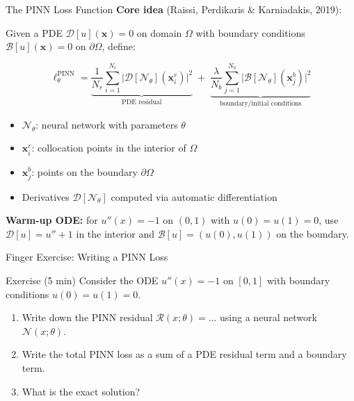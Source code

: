 \documentclass[aspectratio=169,11pt]{beamer}
\newcommand{\emphc}[1]{\textcolor{harvardcrimson}{#1}}
\newcommand{\x}{\bm{x}}
\begin{document}
\begin{frame}{The PINN Loss Function}
\textbf{Core idea} (Raissi, Perdikaris \& Karniadakis, 2019):

\vspace{0.15em}
Given a PDE $\mathcal{D}[u](\x) = 0$ on domain $\Omega$ with boundary conditions
$\mathcal{B}[u](\x) = 0$ on $\partial\Omega$, define:

\vspace{0.1em}
\[
\boxed{
\ell_\theta^{\mathrm{PINN}} =
\underbrace{\frac{1}{N_r}\sum_{i=1}^{N_r}
\bigl|\mathcal{D}[\mathcal{N}_\theta](\x_i^r)\bigr|^2}_{\text{PDE residual}}
\;+\;
\underbrace{\frac{\lambda}{N_b}\sum_{j=1}^{N_b}
\bigl|\mathcal{B}[\mathcal{N}_\theta](\x_j^b)\bigr|^2}_{\text{boundary/initial conditions}}
}
\]

\vspace{0.05em}
\begin{itemize}
    \item $\mathcal{N}_\theta$: neural network with parameters $\theta$
    \item $\x_i^r$: \emphc{collocation points} in the interior of $\Omega$
    \item $\x_j^b$: points on the boundary $\partial\Omega$
    \item Derivatives $\mathcal{D}[\mathcal{N}_\theta]$ computed via \emphc{automatic differentiation}
\end{itemize}
{\scriptsize \textbf{Warm-up ODE:} for $u''(x)=-1$ on $(0,1)$ with $u(0)=u(1)=0$, use $\mathcal{D}[u]=u''+1$ in the interior and $\mathcal{B}[u]=(u(0),u(1))$ on the boundary.}
\end{frame}

\begin{frame}{\exercisepause{} Finger Exercise: Writing a PINN Loss}
\begin{exampleblock}{Exercise (5 min)}
Consider the ODE $u''(x) = -1$ on $[0,1]$ with boundary conditions $u(0) = u(1) = 0$.
\begin{enumerate}
    \item Write down the PINN residual $\mathcal{R}(x; \theta) = \ldots$ using a neural network $\mathcal{N}(x; \theta)$.
    \item Write the total PINN loss as a sum of a PDE residual term and a boundary term.
    \item What is the exact solution?
\end{enumerate}
\end{exampleblock}
\end{frame}
\end{document}
